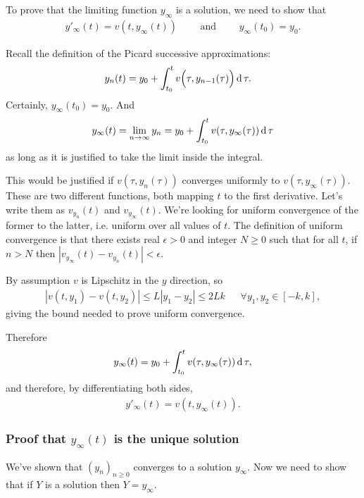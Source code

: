To prove that the limiting function $y_\infty$ is a solution, we need to show
that
\begin{align*}
  y'_\infty(t) = v(t, y_\infty(t)) \text{~~~~~~~and~~~~~~~} y_\infty(t_0) = y_0.
\end{align*}

Recall the definition of the Picard successive approximations:
\begin{align*}
    y_n(t) &= y_0 + \int_{t_0}^t v\Big(\tau, y_{n-1}(\tau)\Big) \operatorname{\text{d}}\tau.
\end{align*}
Certainly, $y_\infty(t_0) = y_0$. And
\begin{align*}
  y_\infty(t) = \lim_{n\to \infty} y_n = y_0 + \int_{t_0}^t v(\tau, y_\infty(\tau)) \operatorname{\text{d}}\tau
\end{align*}
as long as it is justified to take the limit inside the integral.

This would be justified if $v(\tau, y_n(\tau))$ converges uniformly to
$v(\tau, y_\infty(\tau))$. These are two different functions, both mapping $t$
to the first derivative. Let's write them as $v_{y_n}(t)$ and
$v_{y_\infty}(t)$. We're looking for uniform convergence of the former to the
latter, i.e. uniform over all values of $t$. The definition of uniform
convergence is that there exists real $\epsilon > 0$ and integer $N \geq 0$
such that for all $t$, if $n > N$ then
$|v_{y_\infty}(t) - v_{y_n}(t)| < \epsilon$.

By assumption $v$ is Lipschitz in the $y$ direction, so
\begin{align*}
  |v(t, y_1) - v(t, y_2)| \leq L|y_1 - y_2| \leq 2Lk ~~~~~~~\forall y_1, y_2 \in [-k, k],
\end{align*}
giving the bound needed to prove uniform convergence.

Therefore
\begin{align*}
  y_\infty(t) = y_0 + \int_{t_0}^t v(\tau, y_\infty(\tau)) \operatorname{\text{d}}\tau,
\end{align*}
and therefore, by differentiating both sides,
\begin{align*}
  y'_\infty(t) = v(t, y_\infty(t)).
\end{align*}

\subsubsection{Proof that $y_\infty(t)$ is the unique solution}

We've shown that $(y_n)_{n\geq 0}$ converges to a solution $y_\infty$. Now we
need to show that if $Y$ is a solution then $Y = y_\infty$.


